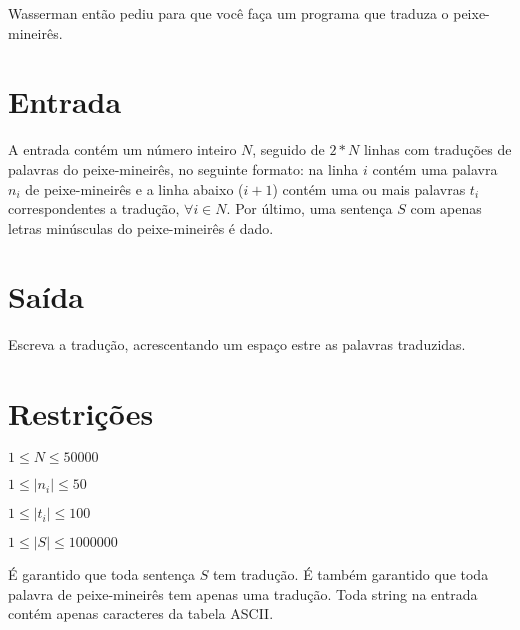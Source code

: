 Wasserman então pediu para que você faça um programa que traduza o peixe-mineirês.

\section*{Entrada}

A entrada contém um número inteiro $N$, seguido de $2*N$ linhas com traduções de palavras
do peixe-mineirês, no seguinte formato: na linha $i$ contém uma palavra $n_i$ de peixe-mineirês 
e a linha abaixo ($i+1$) contém uma ou mais palavras $t_i$ correspondentes 
a tradução, $\forall i \in N$. Por último, uma 
sentença $S$ com apenas letras minúsculas do peixe-mineirês é dado. 

\section*{Saída}

Escreva a tradução, acrescentando um espaço estre as palavras traduzidas.

\section*{Restrições}

$1 \le N \le 50000$

$1 \le |n_i| \le 50$

$1 \le |t_i| \le 100$

$1 \le |S| \le 1000000$ 

É garantido que toda sentença $S$ tem tradução. É também garantido
que toda palavra de peixe-mineirês tem apenas uma tradução.
Toda string na entrada contém apenas caracteres da tabela ASCII.

\exemplo

